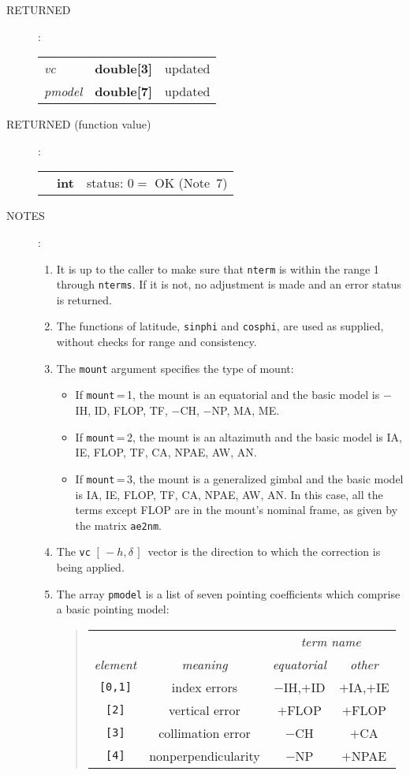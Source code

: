 \documentclass[12pt,fleqn,twoside]{article}
\renewcommand{\_}{{\tt\char'137}}     %
\newcommand{\mhadec}     {$[\,-h,\delta\,]$}
\newcommand{\args}[2]
{
  \goodbreak
  \begin{description}
  \item[#1]: \\[1.5ex] \nopagebreak
    \hspace*{-0.9em}
    \begin{tabular}{p{4.5em}p{5.8em}p{23.5em}}
      #2
    \end{tabular}
  \end{description}
  \vspace{-3ex}
}
\newcommand{\spec}[3]
{
  {\em {#1}} & {\bf \mbox{#2}} & {#3}
}
\newcommand{\notes}[1]
{
  \goodbreak
  \begin{description}
    \item[NOTES]: \nopagebreak
        #1
  \end{description}
  \vspace{-3ex}
}
\begin{document}
\args{RETURNED}
{
\spec{vc}{double[3]}{updated} \\
\spec{pmodel}{double[7]}{updated}
}
\args{RETURNED \rm (function value)}
{
\spec{}{int}{status: $0 =$ OK (Note~7)}
}
\notes{
\begin{enumerate}
\setlength{\parskip}{\medskipamount}
\item It is up to the caller to make sure that {\tt nterm} is within the
      range 1 through {\tt nterms}.  If it is not, no adjustment is made
      and an error status is returned.
\item The functions of latitude, {\tt sinphi} and {\tt cosphi}, are used as
      supplied, without checks for range and consistency.
\item The {\tt mount} argument specifies the type of mount:
      \begin{itemize}
      \item If {\tt mount}\,=\,1, the mount is an equatorial and the
            basic model is $-$IH, ID, FLOP, TF, $-$CH, $-$NP, MA, ME.
      \item If {\tt mount}\,=\,2, the mount is an altazimuth and the
            basic model is IA, IE, FLOP, TF, CA, NPAE, AW, AN.
      \item If {\tt mount}\,=\,3, the mount is a generalized gimbal
            and the basic model is
            IA, IE, FLOP, TF, CA, NPAE, AW, AN.  In this case, all
            the terms except FLOP are in the mount's nominal frame,
            as given by the matrix {\tt ae2nm}.
      \end{itemize}
\item The {\tt vc} \mhadec\ vector is the direction to which the
      correction is being applied.
\item The array {\tt pmodel} is a list of seven pointing coefficients
      which comprise a basic pointing model:
      \begin{quote}
      \begin{tabular}{cccc}
      & & \multicolumn{2}{c}{\it term name} \\
      {\it element} & {\it meaning} & {\it equatorial} & {\it other} \\[1ex]
      {\tt [0,1]} & index errors & $-$IH,$+$ID & $+$IA,$+$IE \\
      {\tt [2]} & vertical error & $+$FLOP & $+$FLOP \\
      {\tt [3]} & collimation error & $-$CH & $+$CA \\
      {\tt [4]} & nonperpendicularity & $-$NP & $+$NPAE \\

\end{tabular}
\end{quote}
\end{enumerate}}
\end{document}
